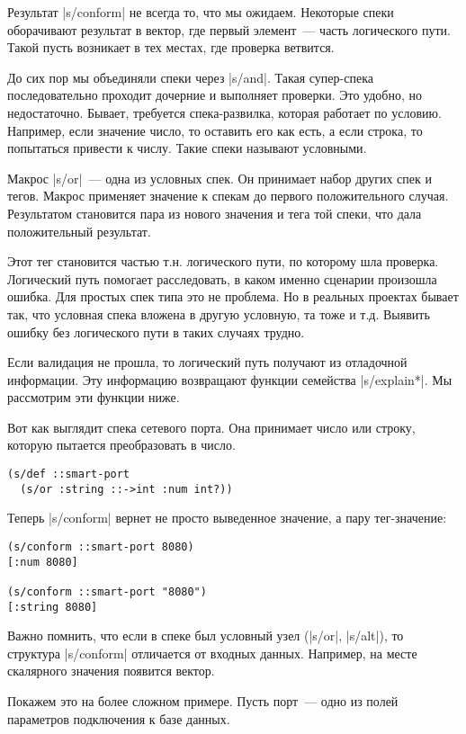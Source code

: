 Результат \spverb|s/conform| не всегда то, что мы ожидаем. Некоторые спеки оборачивают
результат в вектор, где первый элемент~--- часть логического пути. Такой пусть
возникает в тех местах, где проверка ветвится.

До сих пор мы объединяли спеки через \spverb|s/and|. Такая супер-спека последовательно
проходит дочерние и выполняет проверки. Это удобно, но недостаточно. Бывает,
требуется спека-развилка, которая работает по условию. Например, если значение
число, то оставить его как есть, а если строка, то попытаться привести к
числу. Такие спеки называют условными.

Макрос \spverb|s/or|~--- одна из условных спек. Он принимает набор других спек и
тегов. Макрос применяет значение к спекам до первого положительного
случая. Результатом становится пара из нового значения и тега той спеки, что
дала положительный результат.

Этот тег становится частью т.н. логического пути, по которому шла
проверка. Логический путь помогает расследовать, в каком именно сценарии
произошла ошибка. Для простых спек типа это не проблема. Но в реальных проектах
бывает так, что условная спека вложена в другую условную, та тоже и т.д. Выявить
ошибку без логического пути в таких случаях трудно.

Если валидация не прошла, то логический путь получают из отладочной
информации. Эту информацию возвращают функции семейства \spverb|s/explain*|. Мы
рассмотрим эти функции ниже.

Вот как выглядит спека сетевого порта. Она принимает число или строку, которую
пытается преобразовать в число.

\begin{verbatim}
(s/def ::smart-port
  (s/or :string ::->int :num int?))
\end{verbatim}

Теперь \spverb|s/conform| вернет не просто выведенное значение, а пару тег-значение:

\begin{verbatim}
(s/conform ::smart-port 8080)
[:num 8080]

(s/conform ::smart-port "8080")
[:string 8080]
\end{verbatim}

Важно помнить, что если в спеке был условный узел (\spverb|s/or|, \spverb|s/alt|), то
структура \spverb|s/conform| отличается от входных данных. Например, на месте
скалярного значения появится вектор.

Покажем это на более сложном примере. Пусть порт~--- одно из полей параметров
подключения к базе данных.

